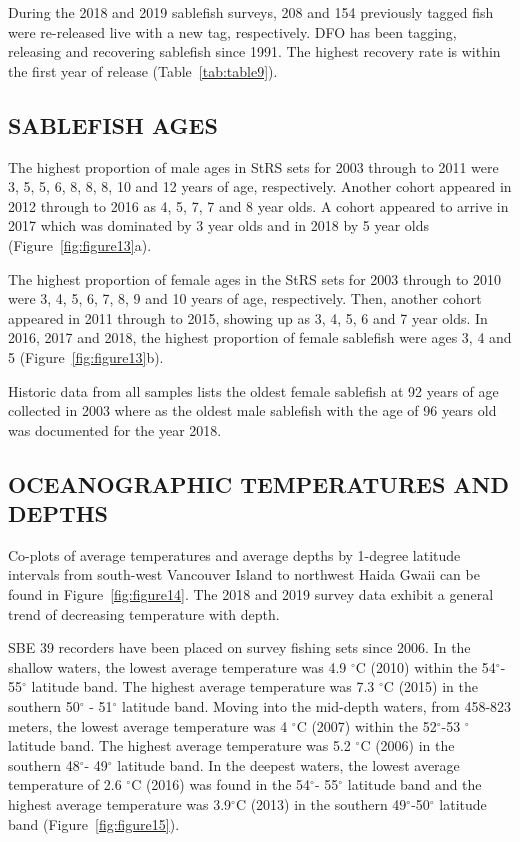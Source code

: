 \documentclass[12pt]{article}\usepackage[]{graphicx}\usepackage[]{color}
\begin{document}
During the 2018 and 2019 sablefish surveys, 208 and 154 previously tagged fish were re-released live with a new tag, respectively. DFO has been tagging, releasing and recovering sablefish since 1991. The highest recovery rate is within the first year of release (Table~\ref{tab:table9}).

\hypertarget{sablefish-ages}{%
\subsection{SABLEFISH AGES}\label{sablefish-ages}}

The highest proportion of male ages in StRS sets for 2003 through to 2011 were 3, 5, 5, 6, 8, 8, 8, 10 and 12 years of age, respectively. Another cohort appeared in 2012 through to 2016 as 4, 5, 7, 7 and 8 year olds. A cohort appeared to arrive in 2017 which was dominated by 3 year olds and in 2018 by 5 year olds (Figure~\ref{fig:figure13}a).

The highest proportion of female ages in the StRS sets for 2003 through to 2010 were 3, 4, 5, 6, 7, 8, 9 and 10 years of age, respectively. Then, another cohort appeared in 2011 through to 2015, showing up as 3, 4, 5, 6 and 7 year olds. In 2016, 2017 and 2018, the highest proportion of female sablefish were ages 3, 4 and 5 (Figure~\ref{fig:figure13}b).

Historic data from all samples lists the oldest female sablefish at 92 years of age collected in 2003 where as the oldest male sablefish with the age of 96 years old was documented for the year 2018.

\hypertarget{oceanographic-temperatures-and-depths}{%
\subsection{OCEANOGRAPHIC TEMPERATURES AND DEPTHS}\label{oceanographic-temperatures-and-depths}}

Co-plots of average temperatures and average depths by 1-degree latitude intervals from south-west Vancouver Island to northwest Haida Gwaii can be found in Figure~\ref{fig:figure14}. The 2018 and 2019 survey data exhibit a general trend of decreasing temperature with depth.

SBE 39 recorders have been placed on survey fishing sets since 2006. In the shallow waters, the lowest average temperature was 4.9 \(^\circ\)C (2010) within the 54\(^\circ\)- 55\(^\circ\) latitude band. The highest average temperature was 7.3 \(^\circ\)C (2015) in the southern 50\(^\circ\) - 51\(^\circ\) latitude band. Moving into the mid-depth waters, from 458-823 meters, the lowest average temperature was 4 \(^\circ\)C (2007) within the 52\(^\circ\)-53 \(^\circ\) latitude band. The highest average temperature was 5.2 \(^\circ\)C (2006) in the southern 48\(^\circ\)- 49\(^\circ\) latitude band. In the deepest waters, the lowest average temperature of 2.6 \(^\circ\)C (2016) was found in the 54\(^\circ\)- 55\(^\circ\) latitude band and the highest average temperature was 3.9\(^\circ\)C (2013) in the southern 49\(^\circ\)-50\(^\circ\) latitude band (Figure~\ref{fig:figure15}).
\end{document}
